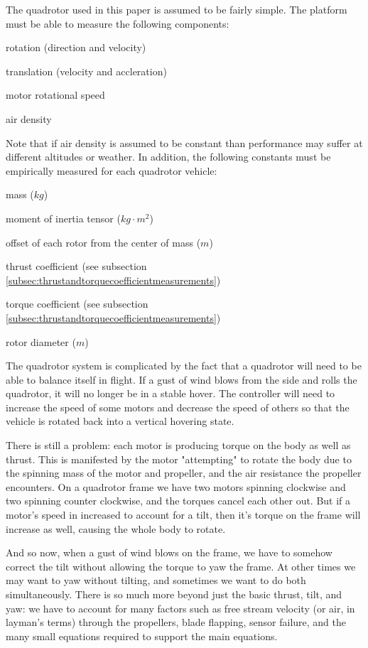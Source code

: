\documentclass{article}
\numberwithin{equation}{section} %
\begin{document}
The quadrotor used in this paper is assumed to be fairly simple. The platform must be able to measure the following components:
\begin{list}{*}{}
	\item rotation (direction and velocity)
	\item translation (velocity and accleration)
	\item motor rotational speed
	\item air density
\end{list}
Note that if air density is assumed to be constant than performance may suffer at different altitudes or weather. In addition, the following constants must be empirically measured for each quadrotor vehicle:
\begin{list}{*}{}
	\item mass ($kg$)
	\item moment of inertia tensor ($kg \cdot m^2$)
	\item offset of each rotor from the center of mass ($m$)
	\item thrust coefficient (see subsection \ref{subsec:thrustandtorquecoefficientmeasurements})
	\item torque coefficient (see subsection \ref{subsec:thrustandtorquecoefficientmeasurements})
	\item rotor diameter ($m$)
\end{list}

The quadrotor system is complicated by the fact that a quadrotor will need to be able to balance itself in flight. If a gust of wind blows from the side and rolls the quadrotor, it will no longer be in a stable hover. The controller will need to increase the speed of some motors and decrease the speed of others so that the vehicle is rotated back into a vertical hovering state.

There is still a problem: each motor is producing torque on the body as well as thrust. This is manifested by the motor "attempting" to rotate the body due to the spinning mass of the motor and propeller, and the air resistance the propeller encounters. On a quadrotor frame we have two motors spinning clockwise and two spinning counter clockwise, and the torques cancel each other out. But if a motor's speed in increased to account for a tilt, then it's torque on the frame will increase as well, causing the whole body to rotate.

And so now, when a gust of wind blows on the frame, we have to somehow correct the tilt without allowing the torque to yaw the frame. At other times we may want to yaw without tilting, and sometimes we want to do both simultaneously.  There is so much more beyond just the basic thrust, tilt, and yaw: we have to account for many factors such as free stream velocity (or air, in layman's terms) through the propellers, blade flapping, sensor failure, and the many small equations required to support the main equations.
\end{document}
